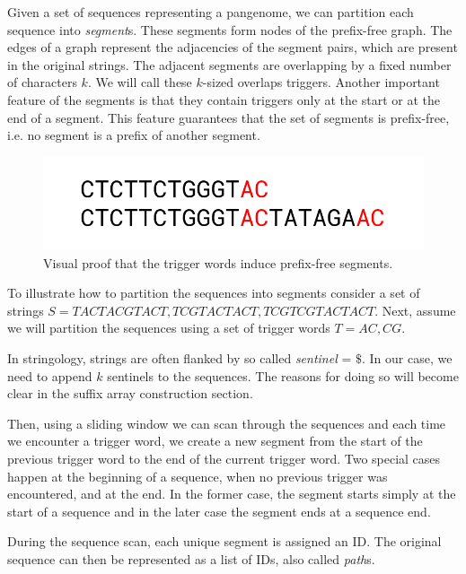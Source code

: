 \documentclass[twocolumn]{ceurart}
\begin{document}
Given a set of sequences representing a pangenome, we can partition each
sequence into \emph{segment}s.
These segments form nodes of the prefix-free graph.
The edges of a graph represent the adjacencies of the segment pairs, which are 
present in the original strings.
The adjacent segments are overlapping by a fixed number of characters $k$.
We will call these $k$-sized overlaps triggers.
Another important feature of the segments is that they contain triggers only at
the start or at the end of a segment.
This feature guarantees that the set of segments is prefix-free, i.e. no
segment is a prefix of another segment.

\begin{figure}
    \centering
    \includegraphics[width=\linewidth]{images/prefixfree_proof.png}
    \caption{Visual proof that the trigger words induce prefix-free segments.}
    \label{fig:proof}
\end{figure}

To illustrate how to partition the sequences into segments consider a set of
strings $S = {TACTACGTACT, TCGTACTACT, TCGTCGTACTACT}$.
Next, assume we will partition the sequences using a set of trigger words 
$T = {AC, CG}$.

In stringology, strings are often flanked by so called \emph{sentinel} = $\$$.
In our case, we need to append $k$ sentinels to the sequences.
The reasons for doing so will become clear in the suffix array construction section.

Then, using a sliding window we can scan through the sequences and each time we
encounter a trigger word, we create a new segment from the start of the previous
trigger word to the end of the current trigger word.
Two special cases happen at the beginning of a sequence, when no previous
trigger was encountered, and at the end.
In the former case, the segment starts simply at the start of a sequence and in
the later case the segment ends at a sequence end.

During the sequence scan, each unique segment is assigned an ID.
The original sequence can then be represented as a list of IDs, also called 
\emph{path}s.
\end{document}
